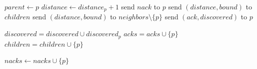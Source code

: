 \documentclass[12pt,a4paper]{report}
\begin{document}
\begin{enumerate}
{\begin{algorithmic}[1]
						\State $parent \gets p$
						\State $distance \gets distance_p + 1$
					\Else
						\State send $nack$ to $p$
					\EndIf
						\State send $(distance, bound)$ to $children$
						\State send $(distance, bound)$ to $neighbors \setminus \{p\}$
						\State send $(ack, discovered)$ to $p$
					\EndIf
				\EndUpon
				\Statex

					\State $discovered = discovered \cup discovered_p$
					\State $acks = acks \cup \{p\}$
					\State $children = children \cup \{p\}$
				\EndUpon
				\Statex

					\State $nacks \gets nacks \cup \{p\}$
				\EndUpon
				\Statex


\end{algorithmic}}
\end{enumerate}
\end{document}

